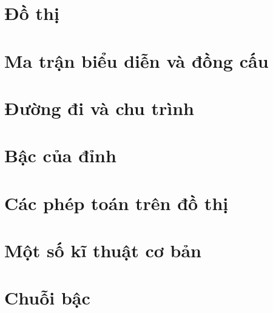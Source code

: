 \documentclass[14pt]{extarticle}
\begin{document}
\section{Đồ thị}


\section{Ma trận biểu diễn và đồng cấu}
\section{Đường đi và chu trình}
\section{Bậc của đỉnh}
\section{Các phép toán trên đồ thị}
\section{Một số kĩ thuật cơ bản}
\section{Chuỗi bậc}
\end{document}
